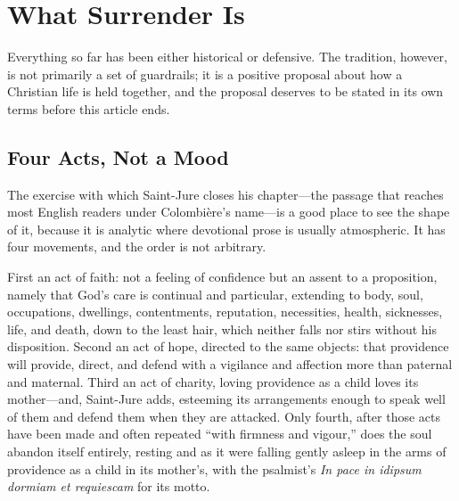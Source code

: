 \section{What Surrender Is}

Everything so far has been either historical or defensive. The tradition, however, is not primarily a set of guardrails; it is a positive proposal about how a Christian life is held together, and the proposal deserves to be stated in its own terms before this article ends.

\subsection{Four Acts, Not a Mood}

The exercise with which Saint-Jure closes his chapter---the passage that reaches most English readers under Colombière's name---is a good place to see the shape of it, because it is analytic where devotional prose is usually atmospheric. It has four movements, and the order is not arbitrary.

First an act of faith: not a feeling of confidence but an assent to a proposition, namely that God's care is continual and particular, extending to body, soul, occupations, dwellings, contentments, reputation, necessities, health, sicknesses, life, and death, down to the least hair, which neither falls nor stirs without his disposition. Second an act of hope, directed to the same objects: that providence will provide, direct, and defend with a vigilance and affection more than paternal and maternal. Third an act of charity, loving providence as a child loves its mother---and, Saint-Jure adds, esteeming its arrangements enough to speak well of them and defend them when they are attacked. Only fourth, after those acts have been made and often repeated ``with firmness and vigour,'' does the soul abandon itself entirely, resting and as it were falling gently asleep in the arms of providence as a child in its mother's, with the psalmist's \emph{In pace in idipsum dormiam et requiescam} for its motto.

